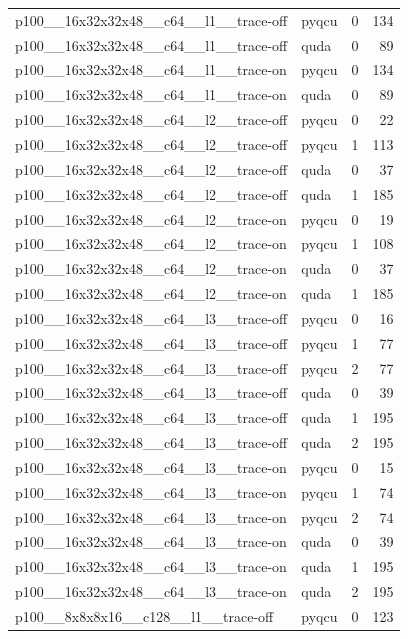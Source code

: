 \begin{table}[htbp]
\begin{tabular}{@{}llrr@{}}
p100\_\_16x32x32x48\_\_c64\_\_l1\_\_trace-off & pyqcu & 0 & 134 \\
p100\_\_16x32x32x48\_\_c64\_\_l1\_\_trace-off & quda & 0 & 89 \\
p100\_\_16x32x32x48\_\_c64\_\_l1\_\_trace-on & pyqcu & 0 & 134 \\
p100\_\_16x32x32x48\_\_c64\_\_l1\_\_trace-on & quda & 0 & 89 \\
p100\_\_16x32x32x48\_\_c64\_\_l2\_\_trace-off & pyqcu & 0 & 22 \\
p100\_\_16x32x32x48\_\_c64\_\_l2\_\_trace-off & pyqcu & 1 & 113 \\
p100\_\_16x32x32x48\_\_c64\_\_l2\_\_trace-off & quda & 0 & 37 \\
p100\_\_16x32x32x48\_\_c64\_\_l2\_\_trace-off & quda & 1 & 185 \\
p100\_\_16x32x32x48\_\_c64\_\_l2\_\_trace-on & pyqcu & 0 & 19 \\
p100\_\_16x32x32x48\_\_c64\_\_l2\_\_trace-on & pyqcu & 1 & 108 \\
p100\_\_16x32x32x48\_\_c64\_\_l2\_\_trace-on & quda & 0 & 37 \\
p100\_\_16x32x32x48\_\_c64\_\_l2\_\_trace-on & quda & 1 & 185 \\
p100\_\_16x32x32x48\_\_c64\_\_l3\_\_trace-off & pyqcu & 0 & 16 \\
p100\_\_16x32x32x48\_\_c64\_\_l3\_\_trace-off & pyqcu & 1 & 77 \\
p100\_\_16x32x32x48\_\_c64\_\_l3\_\_trace-off & pyqcu & 2 & 77 \\
p100\_\_16x32x32x48\_\_c64\_\_l3\_\_trace-off & quda & 0 & 39 \\
p100\_\_16x32x32x48\_\_c64\_\_l3\_\_trace-off & quda & 1 & 195 \\
p100\_\_16x32x32x48\_\_c64\_\_l3\_\_trace-off & quda & 2 & 195 \\
p100\_\_16x32x32x48\_\_c64\_\_l3\_\_trace-on & pyqcu & 0 & 15 \\
p100\_\_16x32x32x48\_\_c64\_\_l3\_\_trace-on & pyqcu & 1 & 74 \\
p100\_\_16x32x32x48\_\_c64\_\_l3\_\_trace-on & pyqcu & 2 & 74 \\
p100\_\_16x32x32x48\_\_c64\_\_l3\_\_trace-on & quda & 0 & 39 \\
p100\_\_16x32x32x48\_\_c64\_\_l3\_\_trace-on & quda & 1 & 195 \\
p100\_\_16x32x32x48\_\_c64\_\_l3\_\_trace-on & quda & 2 & 195 \\
p100\_\_8x8x8x16\_\_c128\_\_l1\_\_trace-off & pyqcu & 0 & 123 \\

\end{tabular}
\end{table}

